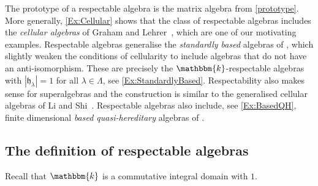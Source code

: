 \documentclass[a4paper,11pt]{amsart}
\numberwithin{equation}{subsection}
\theoremstyle{definition}
\theoremstyle{theorem}
\theoremstyle{remark}
\newcommand\hlam[1][\lambda]{\mathfrak{h}_{#1}}
\newcommand\kk{\mathbbm{k}}
\begin{document}
   The prototype of a respectable algebra is the matrix algebra from
   \autoref{prototype}. More generally, \autoref{Ex:Cellular} shows that the class of
   respectable algebras includes the \emph{cellular algebras} of Graham
   and Lehrer~\cite[Definition~1.1]{GrahamLehrer:Cellular}, which are
   one of our motivating examples. Respectable algebras generalise the \emph{standardly based} algebras of \cite{DuRui:strat}, which slightly weaken the conditions of cellularity to include algebras that do not have an anti-isomorphism. These are precisely the $\kk$-respectable algebras with $|\hlam|=1$ for all $\lambda\in\Lambda$, see \autoref{Ex:StandardlyBased}. Respectability also makes sense for superalgebras and the construction is similar to the generalised cellular algebras of Li and Shi~\cite{LiShi:QuiverHeckeClifford}.  Respectable algebras  also include, see \autoref{Ex:BasedQH},  finite dimensional  \emph{based quasi-hereditary} algebras of \cite{KlMuth, BrundanStroppel:Semiinfinite}.


  \subsection{The definition of respectable algebras}\label{SS:Respectable}
  Recall that $\kk$ is a commutative integral domain with $1$.
\end{document}
